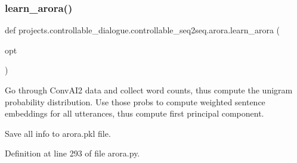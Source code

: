 \mbox{\label{namespaceprojects_1_1controllable__dialogue_1_1controllable__seq2seq_1_1arora_a4fba2bc46a41b5255407e76ca52e0398}} 
\subsubsection{\texorpdfstring{learn\+\_\+arora()}{learn\_arora()}}
{\footnotesize\ttfamily def projects.\+controllable\+\_\+dialogue.\+controllable\+\_\+seq2seq.\+arora.\+learn\+\_\+arora (\begin{DoxyParamCaption}\item[{}]{opt }\end{DoxyParamCaption})}

\begin{DoxyVerb}Go through ConvAI2 data and collect word counts, thus compute the unigram
probability distribution. Use those probs to compute weighted sentence embeddings
for all utterances, thus compute first principal component.

Save all info to arora.pkl file.
\end{DoxyVerb}
 

Definition at line 293 of file arora.\+py.


